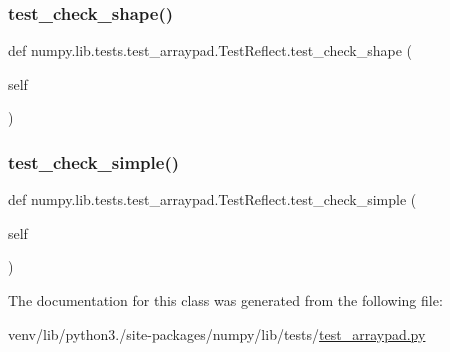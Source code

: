 \subsubsection{\texorpdfstring{test\+\_\+check\+\_\+shape()}{test\_check\_shape()}}
{\footnotesize\ttfamily def numpy.\+lib.\+tests.\+test\+\_\+arraypad.\+Test\+Reflect.\+test\+\_\+check\+\_\+shape (\begin{DoxyParamCaption}\item[{}]{self }\end{DoxyParamCaption})}

\mbox{\label{classnumpy_1_1lib_1_1tests_1_1test__arraypad_1_1TestReflect_a117aeb2c5d6c9b04e20e2677c1586540}} 
\subsubsection{\texorpdfstring{test\+\_\+check\+\_\+simple()}{test\_check\_simple()}}
{\footnotesize\ttfamily def numpy.\+lib.\+tests.\+test\+\_\+arraypad.\+Test\+Reflect.\+test\+\_\+check\+\_\+simple (\begin{DoxyParamCaption}\item[{}]{self }\end{DoxyParamCaption})}



The documentation for this class was generated from the following file\+:\begin{DoxyCompactItemize}
\item 
venv/lib/python3./site-\/packages/numpy/lib/tests/\hyperlink{test__arraypad_8py}{test\+\_\+arraypad.\+py}\end{DoxyCompactItemize}
